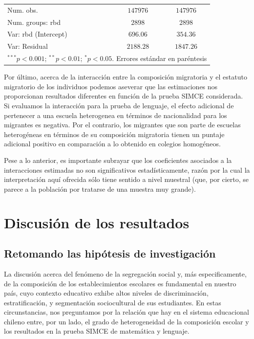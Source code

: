 \documentclass[
]{article}
\begin{document}
\begin{table}
\begin{center}
\begin{tabular}{l c c}
Num. obs.                           & $147976$       & $147976$       \\
Num. groups: rbd                    & $2898$         & $2898$         \\
Var: rbd (Intercept)                & $696.06$       & $354.36$       \\
Var: Residual                       & $2188.28$      & $1847.26$      \\
\hline
\multicolumn{3}{l}{\scriptsize{$^{***}p<0.001$; $^{**}p<0.01$; $^{*}p<0.05$. Errores estándar en paréntesis}}
\end{tabular}
\label{table:coefficients}
\end{center}
\end{table}

Por último, acerca de la interacción entre la composición migratoria y
el estatuto migratorio de los individuos podemos aseverar que las
estimaciones nos proporcionan resultados diferentes en función de la
prueba SIMCE considerada. Si evaluamos la interacción para la prueba de
lenguaje, el efecto adicional de pertenecer a una escuela heterogenea en
términos de nacionalidad para los migrantes es negativa. Por el
contrario, los migrantes que son parte de escuelas heterogéneas en
términos de su composición migratoria tienen un puntaje adicional
positivo en comparación a lo obtenido en colegios homogéneos.

Pese a lo anterior, es importante subrayar que los coeficientes
asociados a la interacciones estimadas no son significativos
estadísticamente, razón por la cual la interpretación aquí ofrecida sólo
tiene sentido a nivel muestral (que, por cierto, se parece a la
población por tratarse de una muestra muy grande).

\hypertarget{discusiuxf3n-de-los-resultados}{%
\section{Discusión de los
resultados}\label{discusiuxf3n-de-los-resultados}}

\hypertarget{retomando-las-hipuxf3tesis-de-investigaciuxf3n}{%
\subsection{Retomando las hipótesis de
investigación}\label{retomando-las-hipuxf3tesis-de-investigaciuxf3n}}

La discusión acerca del fenómeno de la segregación social y, más
especificamente, de la composición de los establecimientos escolares es
fundamental en nuestro país, cuyo contexto educativo exhibe altos
niveles de discriminación, estratificación, y segmentación sociocultural
de sus estudiantes. En estas circunstancias, nos preguntamos por la
relación que hay en el sistema educacional chileno entre, por un lado,
el grado de heterogeneidad de la composición escolar y los resultados en
la prueba SIMCE de matemática y lenguaje.
\end{document}
